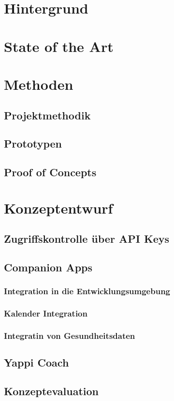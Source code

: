 \documentclass[12pt,a4paper]{report}
\begin{document}
\chapter{Hintergrund}
\chapter{State of the Art}

\chapter{Methoden}
\section{Projektmethodik}
\section{Prototypen}
\section{Proof of Concepts}

\chapter{Konzeptentwurf}
\section{Zugriffskontrolle über API Keys}
\section{Companion Apps}
\subsection{Integration in die Entwicklungsumgebung}
\subsection{Kalender Integration}
\subsection{Integratin von Gesundheitsdaten}
\section{Yappi Coach}
\section{Konzeptevaluation}
\end{document}
